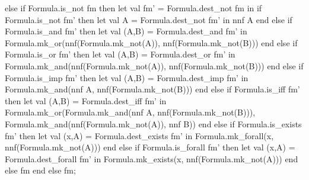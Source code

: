 \nwenddocs{}\endmoddef\nwstartdeflinemarkup{}\nwenddeflinemarkup
else if Formula.is_not fm
then let val fm' = Formula.dest_not fm
     in if Formula.is_not fm'
        then let val A = Formula.dest_not fm'
             in nnf A end
        else if Formula.is_and fm'
        then let val (A,B) = Formula.dest_and fm'
             in Formula.mk_or(nnf(Formula.mk_not(A)),
                              nnf(Formula.mk_not(B))) end
        else if Formula.is_or fm'
        then let val (A,B) = Formula.dest_or fm'
             in Formula.mk_and(nnf(Formula.mk_not(A)),
                              nnf(Formula.mk_not(B))) end
        else if Formula.is_imp fm'
        then let val (A,B) = Formula.dest_imp fm'
             in Formula.mk_and(nnf A,
                               nnf(Formula.mk_not(B))) end
        else if Formula.is_iff fm'
        then let val (A,B) = Formula.dest_iff fm'
             in Formula.mk_or(Formula.mk_and(nnf A,
                                             nnf(Formula.mk_not(B))),
                              Formula.mk_and(nnf(Formula.mk_not(A)),
                                             nnf B))
             end
        else if Formula.is_exists fm'
        then let val (x,A) = Formula.dest_exists fm'
             in Formula.mk_forall(x, nnf(Formula.mk_not(A))) end
        else if Formula.is_forall fm'
        then let val (x,A) = Formula.dest_forall fm'
             in Formula.mk_exists(x, nnf(Formula.mk_not(A))) end
        else fm
     end
else fm;

